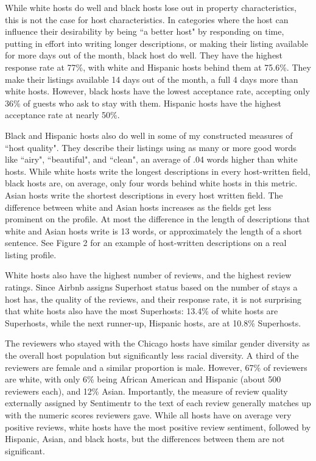 \documentclass[11pt, oneside]{article}
\begin{document}
While white hosts do well and black hosts lose out in property characteristics, this is not the case for host characteristics. In categories where the host can influence their desirability by being ``a better host" by responding on time, putting in effort into writing longer descriptions, or making their listing available for more days out of the month, black host do well. They have the highest response rate at 77\%, with white and Hispanic hosts behind them at 75.6\%. They make their listings available 14 days out of the month, a full 4 days more than white hosts. However, black hosts have the lowest acceptance rate, accepting only 36\% of guests who ask to stay with them. Hispanic hosts have the highest acceptance rate at nearly 50\%. 

Black and Hispanic hosts also do well in some of my constructed measures of ``host quality". They describe their listings using  as many or more good words like ``airy", ``beautiful", and ``clean", an average of .04 words higher than white hosts. While white hosts write the longest descriptions in every host-written field, black hosts are, on average, only four words behind white hosts in this metric. Asian hosts write the shortest descriptions in every host written field. The difference between white and Asian hosts increases as the fields get less prominent on the profile. At most the difference in the length of descriptions that white and Asian hosts write is 13 words, or approximately the length of a short sentence. See Figure 2 for an example of host-written descriptions on a real listing profile. 

White hosts also have the highest number of reviews, and the highest review ratings. Since Airbnb assigns Superhost status based on the number of stays a host has, the quality of the reviews, and their response rate, it is not surprising that white hosts also have the most Superhosts: 13.4\% of white hosts are Superhosts, while the next runner-up, Hispanic hosts, are at 10.8\% Superhosts. 

The reviewers who stayed with the Chicago hosts have similar gender diversity as the overall host population but significantly less racial diversity. A third of the reviewers are female and a similar proportion is male. However, 67\% of reviewers are white, with only 6\% being African American and Hispanic (about 500 reviewers each), and 12\% Asian. Importantly, the measure of review quality externally assigned by Sentimentr to the text of each review generally matches up with the numeric scores reviewers gave. While all hosts have on average very positive reviews, white hosts have the most positive review sentiment, followed by Hispanic, Asian, and black hosts, but the differences between them are not significant. 
\end{document}
